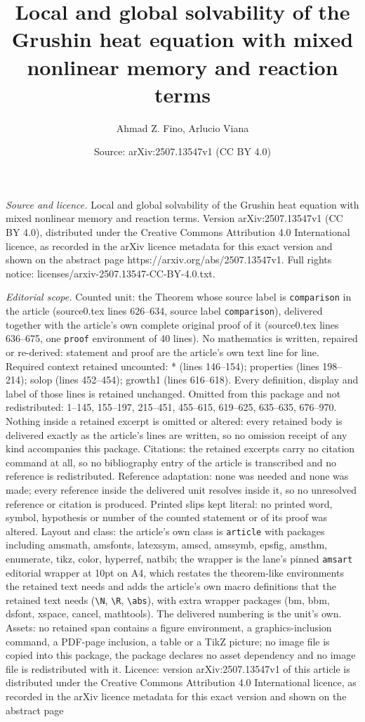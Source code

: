 \documentclass[10pt,a4paper]{amsart}
\title[Local and global solvability of the Grushin heat equation wi]{Local and global solvability of the Grushin heat equation with mixed nonlinear memory and reaction terms}
\author{Ahmad Z. Fino, Arlucio Viana}
\date{Source: arXiv:2507.13547v1 (CC BY 4.0)}
\begin{document}
\maketitle

\noindent\emph{Source and licence.} Local and global solvability of the Grushin heat equation with mixed nonlinear memory and reaction terms. Version arXiv:2507.13547v1 (CC BY 4.0), distributed under the Creative Commons Attribution 4.0 International licence, as recorded in the arXiv licence metadata for this exact version and shown on the abstract page https://arxiv.org/abs/2507.13547v1. Full rights notice: licenses/arxiv-2507.13547-CC-BY-4.0.txt.\par\smallskip

\noindent\textit{Editorial scope.} Counted unit: the Theorem whose source label is \texttt{comparison} in the article (source0.tex lines 626--634, source label \texttt{comparison}), delivered together with the article's own complete original proof of it (source0.tex lines 636--675, one \texttt{proof} environment of 40 lines). No mathematics is written, repaired or re-derived: statement and proof are the article's own text line for line. Required context retained uncounted: * (lines 146--154); properties (lines 198--214); solop (lines 452--454); growth1 (lines 616--618). Every definition, display and label of those lines is retained unchanged. Omitted from this package and not redistributed: 1--145, 155--197, 215--451, 455--615, 619--625, 635--635, 676--970. Nothing inside a retained excerpt is omitted or altered: every retained body is delivered exactly as the article's lines are written, so no omission receipt of any kind accompanies this package. Citations: the retained excerpts carry no citation command at all, so no bibliography entry of the article is transcribed and no reference is redistributed. Reference adaptation: none was needed and none was made; every reference inside the delivered unit resolves inside it, so no unresolved reference or citation is produced. Printed slips kept literal: no printed word, symbol, hypothesis or number of the counted statement or of its proof was altered. Layout and class: the article's own class is \texttt{article} with packages including amsmath, amsfonts, latexsym, amscd, amssymb, epsfig, amsthm, enumerate, tikz, color, hyperref, natbib; the wrapper is the lane's pinned \texttt{amsart} editorial wrapper at 10pt on A4, which restates the theorem-like environments the retained text needs and adds the article's own macro definitions that the retained text needs (\texttt{\textbackslash N}, \texttt{\textbackslash R}, \texttt{\textbackslash abs}), with extra wrapper packages (bm, bbm, dsfont, xspace, cancel, mathtools). The delivered numbering is the unit's own. Assets: no retained span contains a figure environment, a graphics-inclusion command, a PDF-page inclusion, a table or a TikZ picture; no image file is copied into this package, the package declares no asset dependency and no image file is redistributed with it. Licence: version arXiv:2507.13547v1 of this article is distributed under the Creative Commons Attribution 4.0 International licence, as recorded in the arXiv licence metadata for this exact version and shown on the abstract page 
\end{document}
